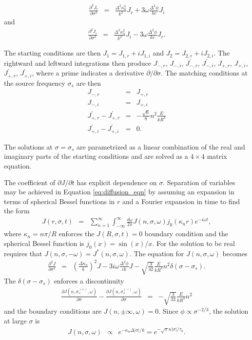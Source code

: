 \documentclass{aastex63}
\newcommand{\be}{\begin{eqnarray}}
\newcommand{\ee}{\end{eqnarray}}
\begin{document}
\be
 \frac{\partial^2 J_r}{\partial \sigma^2} &= & 
  \frac{\Delta^2 \kappa_n^2}{k^2} J_r  
 + 3 \omega \frac{\Delta^2 \phi}{kc}    J_i
\ee
and
\be
 \frac{\partial^2 J_i}{\partial \sigma^2} &= & 
  \frac{\Delta^2 \kappa_n^2}{k^2} J_i   
 - 3 \omega \frac{\Delta^2 \phi}{kc}    J_r.
\ee

The starting conditions are then $J_1 = J_{1,r} + iJ_{1,i}$ and $J_2 = J_{2,r}+iJ_{2,i}$.
The rightward and leftward integrations then produce $J_{-,r}$, $J_{-,i}$, $J^\prime_{-,r}$, $J^\prime_{-,i}$,  $J_{+,r}$, $J_{+,i}$, $J^\prime_{+,r}$, $J^\prime_{+,i}$, where a prime indicates a derivative $\partial/\partial \sigma$. The matching conditions at the source frequency $\sigma_s$ are then
\be
J_{-,r} & =& J_{+,r} \\
J_{-,i} & =& J_{+,i} \\
 J_{+,r}^\prime - J_{+,r}^\prime & = & 
- \frac{\sqrt{6}}{8} n^2 \frac{E}{kR^3} \\
J_{+,i}^\prime - J_{+,i}^\prime & = & 0.
\ee

The solutions at $\sigma=\sigma_s$ are parametrized as a linear combination of the real and imaginary parts of the starting conditions and are solved as a $4\times4$ matrix equation.

\ifx
The coefficient of $\partial J/\partial t$ has explicit dependence on $\sigma$. Separation of variables may be achieved in Equation \ref{eq:diffusion_eqn} by assuming an expansion in terms of spherical Bessel functions in $r$ and a Fourier expansion in time to find the form
\be
J(r,\sigma,t) & = & \sum_{n=1}^\infty \int_{-\infty}^\infty \frac{d\omega}{2\pi} J(n,\sigma,\omega) j_0(\kappa_n r) e^{-i \omega t},
\ee
where $\kappa_n = n\pi/R$ enforces the $J(R,\sigma,t)=0$ boundary condition and the spherical Bessel function is $j_0(x)=\sin(x)/x$. For the solution to be real requires that $J(n,\sigma,-\omega) = J^*(n,\sigma,\omega)$. The equation for $J(n,\sigma,\omega)$ becomes
\be
\frac{\partial^2 J}{\partial \sigma^2} & = & \left( \frac{\Delta \kappa_n}{k} \right)^2 J
- 3i\omega \frac{\Delta^2 \phi}{ck} J
- \sqrt{ \frac{3}{32} } \frac{E}{kR^3} n^2 \delta(\sigma - \sigma_s).
\label{eq:response}
\ee
The $\delta(\sigma - \sigma_s)$ enforces a discontinuity
\be
\frac{\partial J(n,\sigma_s^{(+)},\omega)}{\partial \sigma} - \frac{\partial J(n,\sigma_s^{(-)},\omega)}{\partial \sigma} & = & 
- \sqrt{ \frac{3}{32} } \frac{E}{kR^3} n^2
\label{eq:discontinuity}
\ee
and the boundary conditions are $J(n,\pm \infty,\omega)=0$. Since $\phi \propto \sigma^{-2/3}$, the solution at large $\sigma$ is 
\be
J(n,\sigma,\omega) & \propto & e^{-\kappa_n \Delta |\sigma| /k}
= e^{-\sqrt{\pi} n |\sigma | / \tau_0}.
\label{eq:finite_bc}
\ee
\fi
\end{document}
